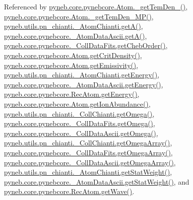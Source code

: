 Referenced by \hyperlink{pynebcore_8py_source_l01869}{pyneb.\-core.\-pynebcore.\-Atom.\-\_\-get\-Tem\-Den\-\_()}, \hyperlink{pynebcore_8py_source_l02046}{pyneb.\-core.\-pynebcore.\-Atom.\-\_\-get\-Tem\-Den\-\_\-\-M\-P()}, \hyperlink{pn__chianti_8py_source_l00316}{pyneb.\-utils.\-pn\-\_\-chianti.\-\_\-\-Atom\-Chianti.\-get\-A()}, \hyperlink{pynebcore_8py_source_l00487}{pyneb.\-core.\-pynebcore.\-\_\-\-Atom\-Data\-Ascii.\-get\-A()}, \hyperlink{pynebcore_8py_source_l00711}{pyneb.\-core.\-pynebcore.\-\_\-\-Coll\-Data\-Fits.\-get\-Cheb\-Order()}, \hyperlink{pynebcore_8py_source_l01759}{pyneb.\-core.\-pynebcore.\-Atom.\-get\-Crit\-Density()}, \hyperlink{pynebcore_8py_source_l01782}{pyneb.\-core.\-pynebcore.\-Atom.\-get\-Emissivity()}, \hyperlink{pn__chianti_8py_source_l00366}{pyneb.\-utils.\-pn\-\_\-chianti.\-\_\-\-Atom\-Chianti.\-get\-Energy()}, \hyperlink{pynebcore_8py_source_l00537}{pyneb.\-core.\-pynebcore.\-\_\-\-Atom\-Data\-Ascii.\-get\-Energy()}, \hyperlink{pynebcore_8py_source_l02927}{pyneb.\-core.\-pynebcore.\-Rec\-Atom.\-get\-Energy()}, \hyperlink{pynebcore_8py_source_l02176}{pyneb.\-core.\-pynebcore.\-Atom.\-get\-Ion\-Abundance()}, \hyperlink{pn__chianti_8py_source_l00507}{pyneb.\-utils.\-pn\-\_\-chianti.\-\_\-\-Coll\-Chianti.\-get\-Omega()}, \hyperlink{pynebcore_8py_source_l00828}{pyneb.\-core.\-pynebcore.\-\_\-\-Coll\-Data\-Fits.\-get\-Omega()}, \hyperlink{pynebcore_8py_source_l01082}{pyneb.\-core.\-pynebcore.\-\_\-\-Coll\-Data\-Ascii.\-get\-Omega()}, \hyperlink{pn__chianti_8py_source_l00484}{pyneb.\-utils.\-pn\-\_\-chianti.\-\_\-\-Coll\-Chianti.\-get\-Omega\-Array()}, \hyperlink{pynebcore_8py_source_l00800}{pyneb.\-core.\-pynebcore.\-\_\-\-Coll\-Data\-Fits.\-get\-Omega\-Array()}, \hyperlink{pynebcore_8py_source_l01058}{pyneb.\-core.\-pynebcore.\-\_\-\-Coll\-Data\-Ascii.\-get\-Omega\-Array()}, \hyperlink{pn__chianti_8py_source_l00343}{pyneb.\-utils.\-pn\-\_\-chianti.\-\_\-\-Atom\-Chianti.\-get\-Stat\-Weight()}, \hyperlink{pynebcore_8py_source_l00514}{pyneb.\-core.\-pynebcore.\-\_\-\-Atom\-Data\-Ascii.\-get\-Stat\-Weight()}, and \hyperlink{pynebcore_8py_source_l02699}{pyneb.\-core.\-pynebcore.\-Rec\-Atom.\-get\-Wave()}.


